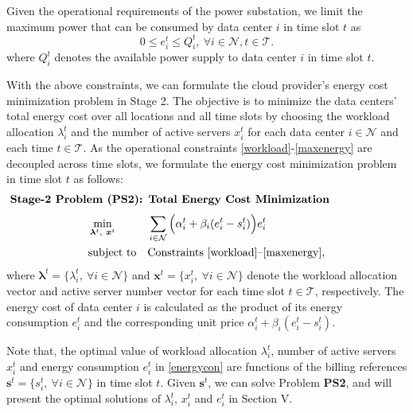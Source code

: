 \documentclass[journal]{IEEEtran}
\begin{document}
	Given the operational requirements of the power substation, we limit the maximum power that can be consumed by data center $i$ in time slot $t$ as
	\begin{equation}\label{maxenergy}
	0 \leq e_{i}^{t} \leq Q_{i}^{t},~\forall i \in \mathcal{N}, t \in \mathcal{T}.
	\end{equation}
	where $Q_{i}^{t}$ denotes the available power supply to data center $i$ in time slot $t$.
	
	With the above constraints, we can formulate the cloud provider's energy cost minimization problem in Stage 2. The objective is to minimize the data centers' total energy cost over all locations and all time slots by choosing the workload allocation $\lambda_{i}^{t}$ and the number of active servers $x_{i}^{t}$ for each data center $i\in\mathcal{N}$ and each time $t\in\mathcal{T}$. As the operational constraints \eqref{workload}-\eqref{maxenergy} are decoupled across time slots, we formulate the energy cost minimization problem in time slot $t$ as follows:
	\begin{align*}
	& \leftline{\textbf{Stage-2 Problem (PS2): Total Energy Cost Minimization}}
	\end{align*}
\begin{equation*}
	  \begin{aligned}
	  & \min_{\boldsymbol{\lambda}^{t},~\boldsymbol{x}^{t}} 
	  && \sum_{i \in \mathcal{N}} \Big( \alpha_{i}^{t} +\beta_{i} (e_{i}^{t}-s_{i}^{t}) \Big) e_{i}^{t} \\
	  & \text{subject to}  
	  && \text{Constraints \eqref{workload}--\eqref{maxenergy}},
	  \end{aligned}
	\end{equation*}
	where $\boldsymbol{\lambda}^{t} = \{ \lambda_i^t,~\forall i\in\mathcal{N}\}$ and $\boldsymbol{x}^{t} = \{ x_i^t,~\forall i\in\mathcal{N} \}$ denote the workload allocation vector and active server number vector for each time slot $t\in\mathcal{T}$, respectively. The energy cost of data center $i$ is calculated as the product of its energy consumption $e_{i}^{t}$ and the corresponding unit price $\alpha_{i}^{t} +\beta_{i} (e_{i}^{t}-s_{i}^{t})$.
	
	Note that, the optimal value of workload allocation $\lambda_i^t$, number of active servers $x_i^t$ and energy consumption $e_i^t$ in \eqref{energycon} are functions of the billing references $\boldsymbol{s}^{t}=\{ s_i^t,~\forall i\in\mathcal{N} \}$ in time slot $t$. Given $\boldsymbol{s}^{t}$, we can solve Problem \textbf{PS2}, and will present the optimal solutions of $\lambda_i^t$, $x_i^t$ and $e_i^t$ in Section V.
	
\end{document}
